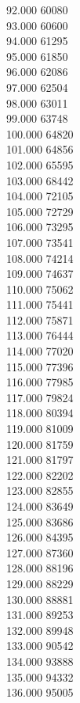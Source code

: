 { 92.000	60080 \\
 93.000	60600 \\
 94.000	61295 \\
 95.000	61850 \\
 96.000	62086 \\
 97.000	62504 \\
 98.000	63011 \\
 99.000	63748 \\
 100.000	64820 \\
 101.000	64856 \\
 102.000	65595 \\
 103.000	68442 \\
 104.000	72105 \\
 105.000	72729 \\
 106.000	73295 \\
 107.000	73541 \\
 108.000	74214 \\
 109.000	74637 \\
 110.000	75062 \\
 111.000	75441 \\
 112.000	75871 \\
 113.000	76444 \\
 114.000	77020 \\
 115.000	77396 \\
 116.000	77985 \\
 117.000	79824 \\
 118.000	80394 \\
 119.000	81009 \\
 120.000	81759 \\
 121.000	81797 \\
 122.000	82202 \\
 123.000	82855 \\
 124.000	83649 \\
 125.000	83686 \\
 126.000	84395 \\
 127.000	87360 \\
 128.000	88196 \\
 129.000	88229 \\
 130.000	88881 \\
 131.000	89253 \\
 132.000	89948 \\
 133.000	90542 \\
 134.000	93888 \\
 135.000	94332 \\
 136.000	95005 \\
}
